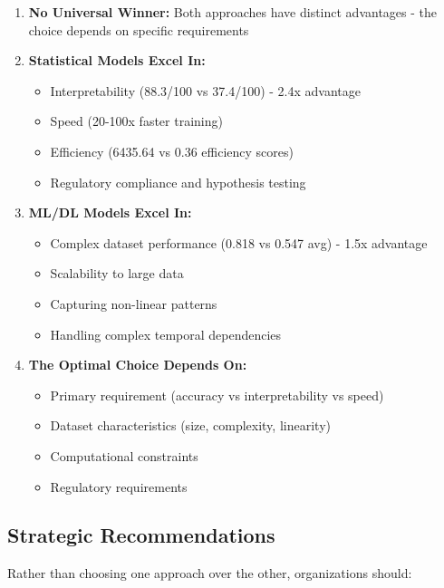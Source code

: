 \documentclass[11pt,a4paper]{article}
\begin{document}
\begin{enumerate}
    \item \textbf{No Universal Winner:} Both approaches have distinct advantages - the choice depends on specific requirements
    
    \item \textbf{Statistical Models Excel In:}
    \begin{itemize}
        \item Interpretability (88.3/100 vs 37.4/100) - 2.4x advantage
        \item Speed (20-100x faster training)
        \item Efficiency (6435.64 vs 0.36 efficiency scores)
        \item Regulatory compliance and hypothesis testing
    \end{itemize}
    
    \item \textbf{ML/DL Models Excel In:}
    \begin{itemize}
        \item Complex dataset performance (0.818 vs 0.547 avg) - 1.5x advantage
        \item Scalability to large data
        \item Capturing non-linear patterns
        \item Handling complex temporal dependencies
    \end{itemize}
    
    \item \textbf{The Optimal Choice Depends On:}
    \begin{itemize}
        \item Primary requirement (accuracy vs interpretability vs speed)
        \item Dataset characteristics (size, complexity, linearity)
        \item Computational constraints
        \item Regulatory requirements
    \end{itemize}
\end{enumerate}

\subsection{Strategic Recommendations}

Rather than choosing one approach over the other, organizations should:
\end{document}
